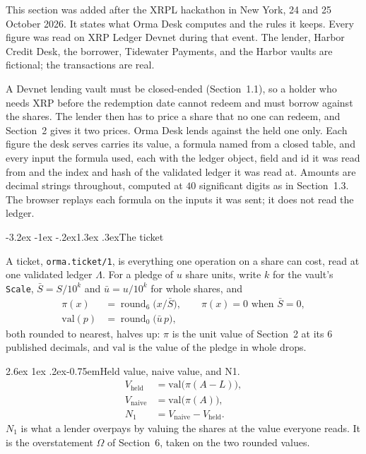 \documentclass[11pt]{article}
\makeatletter
\renewcommand\subsection{\@startsection{subsection}{2}{\z@}%
  {-3.2ex \@plus -1ex \@minus -.2ex}{1.3ex \@plus .3ex}{\normalfont\large\bfseries}}
\renewcommand\paragraph{\@startsection{paragraph}{4}{\z@}%
  {2.6ex \@plus 1ex \@minus .2ex}{-0.75em}{\normalfont\normalsize\bfseries}}
\theoremstyle{orma}
\theoremstyle{ormaupright}
\DeclareMathOperator{\round}{round}
\makeatother
\begin{document}
This section was added after the XRPL hackathon in New York, 24 and 25 October 2026. It
states what Orma Desk computes and the rules it keeps. Every figure was read on XRP Ledger
Devnet during that event. The lender, Harbor Credit Desk, the borrower, Tidewater Payments,
and the Harbor vaults are fictional; the transactions are real.

A Devnet lending vault must be closed-ended (Section~1.1), so a holder who needs XRP before
the redemption date cannot redeem and must borrow against the shares. The lender then has to
price a share that no one can redeem, and Section~2 gives it two prices. Orma Desk lends
against the held one only. Each figure the desk serves carries its value, a formula named
from a closed table, and every input the formula used, each with the ledger object, field and
id it was read from and the index and hash of the validated ledger it was read at. Amounts
are decimal strings throughout, computed at $40$ significant digits as in Section~1.3. The
browser replays each formula on the inputs it was sent; it does not read the ledger.

\subsection{The ticket}

A ticket, \texttt{orma.ticket/1}, is everything one operation on a share can cost, read at
one validated ledger $\Lambda$. For a pledge of $u$ share units, write $k$ for the vault's
\texttt{Scale}, $\bar S = S/10^{k}$ and $\bar u = u/10^{k}$ for whole shares, and
\begin{align}
  \pi(x) &= \round_{6}\!\big( x / \bar S \big),
  \qquad \pi(x) = 0 \text{ when } \bar S = 0,
  \\[4pt]
  \mathrm{val}(p) &= \round_{0}\!\big( \bar u \, p \big),
\end{align}
both rounded to nearest, halves up: $\pi$ is the unit value of Section~2 at its $6$
published decimals, and $\mathrm{val}$ is the value of the pledge in whole drops.

\paragraph{Held value, naive value, and N1.}
\begin{align}
  V_{\mathrm{held}} &= \mathrm{val}\big( \pi(A - L) \big),
  \\[4pt]
  V_{\mathrm{naive}} &= \mathrm{val}\big( \pi(A) \big),
  \\[4pt]
  N_{1} &= V_{\mathrm{naive}} - V_{\mathrm{held}} .
\end{align}
$N_1$ is what a lender overpays by valuing the shares at the value everyone reads. It is the
overstatement $\Omega$ of Section~6, taken on the two rounded values.
\end{document}
